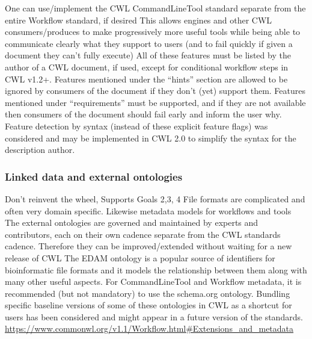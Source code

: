 One can use/implement the CWL CommandLineTool standard separate from the entire Workflow standard, if desired
This allows engines and other CWL consumers/produces to make progressively more useful tools while being able to communicate clearly what they support to users (and to fail quickly if given a document they can’t fully execute)
All of these features must be listed by the author of a CWL document, if used, except for conditional workflow steps in CWL v1.2+. Features mentioned under the “hints” section are allowed to be ignored by consumers of the document if they don’t (yet) support them. Features mentioned under “requirements” must be supported, and if they are not available then consumers of the document should fail early and inform the user why.
Feature detection by syntax (instead of these explicit feature flags) was considered and may be implemented in CWL 2.0 to simplify the syntax for the description author.

\subsubsection{Linked data and external ontologies}

Don’t reinvent the wheel, Supports Goals 2,3, 4
File formats are complicated and often very domain specific. Likewise metadata models for workflows and tools
The external ontologies are governed and maintained by experts and contributors, each on their own cadence separate from the CWL standards cadence. Therefore they can be improved/extended without waiting for a new release of CWL
The EDAM ontology is a popular source of identifiers for bioinformatic file formats and it models the relationship between them along with many other useful aspects. For CommandLineTool and Workflow metadata, it is recommended (but not mandatory) to use the schema.org ontology.
Bundling specific baseline versions of some of these ontologies in CWL as a shortcut for users has been considered and might appear in a future version of the standards.
\url{https://www.commonwl.org/v1.1/Workflow.html#Extensions_and_metadata}


